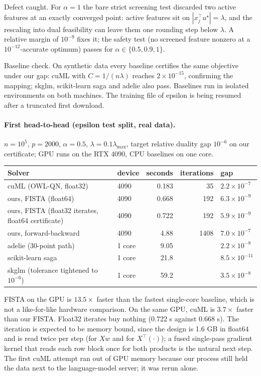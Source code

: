 \documentclass[11pt]{article}
\begin{document}
Defect caught. For $\alpha=1$ the bare strict screening test discarded two
active features at an exactly converged point: active features sit on
$|x_j^\top u^\star| = \lambda$, and the rescaling into dual feasibility can leave
them one rounding step below $\lambda$. A relative margin of $10^{-9}$ fixes it;
the safety test (no screened feature nonzero at a $10^{-12}$-accurate optimum)
passes for $\alpha \in \{0.5, 0.9, 1\}$.

Baseline check. On synthetic data every baseline certifies the same
objective under our gap: cuML with $C = 1/(n\lambda)$ reaches $2\times10^{-15}$,
confirming the mapping; skglm, scikit-learn saga and adelie also pass.
Baselines run in isolated environments on both machines. The training file
of epsilon is being resumed after a truncated first download.

\paragraph{First head-to-head (epsilon test split, real data).}
$n=10^5$, $p=2000$, $\alpha=0.5$, $\lambda=0.1\lambda_{\max}$, target relative duality
gap $10^{-6}$ on our certificate; GPU runs on the RTX 4090, CPU baselines on
one core. 

\begin{center}
\small
\begin{tabular}{llrrl}
\toprule
Solver & device & seconds & iterations & gap \\
\midrule
cuML (OWL-QN, float32) & 4090 & 0.183 & 35 & $2.2\times10^{-7}$ \\
ours, FISTA (float64) & 4090 & 0.668 & 192 & $6.3\times10^{-9}$ \\
ours, FISTA (float32 iterates, float64 certificate) & 4090 & 0.722 & 192 & $5.9\times10^{-9}$ \\
ours, forward-backward & 4090 & 4.88 & 1408 & $7.0\times10^{-7}$ \\
adelie (30-point path) & 1 core & 9.05 & & $2.2\times10^{-8}$ \\
scikit-learn saga & 1 core & 21.8 & & $8.5\times10^{-11}$ \\
skglm (tolerance tightened to $10^{-6}$) & 1 core & 59.2 & & $3.5\times10^{-8}$ \\
\bottomrule
\end{tabular}
\end{center}

FISTA on the GPU is $13.5\times$ faster than the fastest single-core baseline,
which is not a like-for-like hardware comparison. On the same GPU, cuML is
$3.7\times$ faster than our FISTA. Float32 iterates buy nothing (0.722 s against
0.668 s). The iteration is expected to be memory bound, since the design is
1.6 GB in float64 and is read twice per step (for $Xw$ and for $X^\top(\cdot)$);
a fused single-pass gradient kernel that reads each row block once for both
products is the natural next step. The first cuML attempt ran out of GPU
memory because our process still held the data next to the language-model
server; it was rerun alone.
\end{document}
